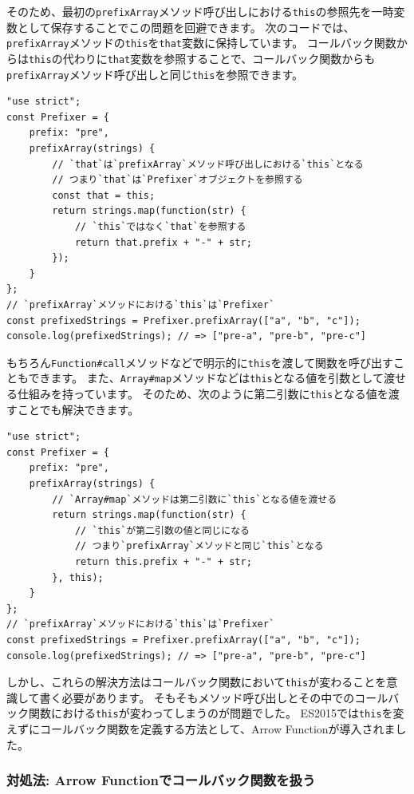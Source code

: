 そのため、最初の\texttt{prefixArray}メソッド呼び出しにおける\texttt{this}の参照先を一時変数として保存することでこの問題を回避できます。
次のコードでは、\texttt{prefixArray}メソッドの\texttt{this}を\texttt{that}変数に保持しています。
コールバック関数からは\texttt{this}の代わりに\texttt{that}変数を参照することで、コールバック関数からも\texttt{prefixArray}メソッド呼び出しと同じ\texttt{this}を参照できます。

\begin{lstlisting}
"use strict";
const Prefixer = {
    prefix: "pre",
    prefixArray(strings) {
        // `that`は`prefixArray`メソッド呼び出しにおける`this`となる
        // つまり`that`は`Prefixer`オブジェクトを参照する
        const that = this;
        return strings.map(function(str) {
            // `this`ではなく`that`を参照する
            return that.prefix + "-" + str;
        });
    }
};
// `prefixArray`メソッドにおける`this`は`Prefixer`
const prefixedStrings = Prefixer.prefixArray(["a", "b", "c"]);
console.log(prefixedStrings); // => ["pre-a", "pre-b", "pre-c"]
\end{lstlisting}

もちろん\texttt{Function\#call}メソッドなどで明示的に\texttt{this}を渡して関数を呼び出すこともできます。
また、\texttt{Array\#map}メソッドなどは\texttt{this}となる値を引数として渡せる仕組みを持っています。
そのため、次のように第二引数に\texttt{this}となる値を渡すことでも解決できます。

\begin{lstlisting}
"use strict";
const Prefixer = {
    prefix: "pre",
    prefixArray(strings) {
        // `Array#map`メソッドは第二引数に`this`となる値を渡せる
        return strings.map(function(str) {
            // `this`が第二引数の値と同じになる
            // つまり`prefixArray`メソッドと同じ`this`となる
            return this.prefix + "-" + str;
        }, this);
    }
};
// `prefixArray`メソッドにおける`this`は`Prefixer`
const prefixedStrings = Prefixer.prefixArray(["a", "b", "c"]);
console.log(prefixedStrings); // => ["pre-a", "pre-b", "pre-c"]
\end{lstlisting}

しかし、これらの解決方法はコールバック関数において\texttt{this}が変わることを意識して書く必要があります。
そもそもメソッド呼び出しとその中でのコールバック関数における\texttt{this}が変わってしまうのが問題でした。
ES2015では\texttt{this}を変えずにコールバック関数を定義する方法として、Arrow
Functionが導入されました。

\hypertarget{arrow-function-callback}{%
\subsubsection{対処法: Arrow
Functionでコールバック関数を扱う}\label{arrow-function-callback}}

